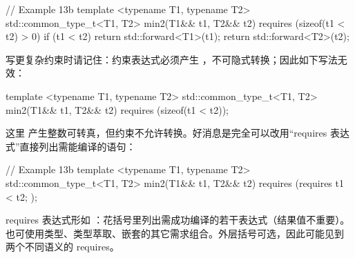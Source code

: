 \begin{code}
// Example 13b
template <typename T1, typename T2>
std::common_type_t<T1, T2> min2(T1&& t1, T2&& t2)
  requires (sizeof(t1 < t2) > 0)
{
  if (t1 < t2) return std::forward<T1>(t1);
  return std::forward<T2>(t2);
}
\end{code}

写更复杂约束时请记住：约束表达式必须产生 ，不可隐式转换；因此如下写法无效：

\begin{code}
template <typename T1, typename T2>
std::common_type_t<T1, T2> min2(T1&& t1, T2&& t2)
  requires (sizeof(t1 < t2));
\end{code}

这里  产生整数可转真，但约束不允许转换。好消息是完全可以改用“requires 表达式”直接列出需能编译的语句：

\begin{code}
// Example 13b
template <typename T1, typename T2>
std::common_type_t<T1, T2> min2(T1&& t1, T2&& t2)
  requires (requires { t1 < t2; });
\end{code}

requires 表达式形如 ：花括号里列出需成功编译的若干表达式（结果值不重要）。也可使用类型、类型萃取、嵌套的其它需求组合。外层括号可选，因此可能见到  两个不同语义的 requires。

